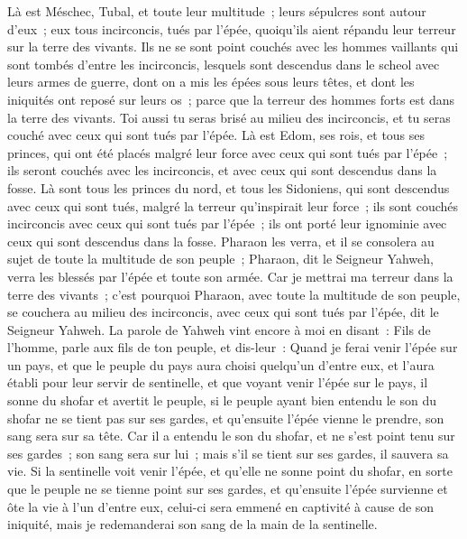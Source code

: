 \begin{multicols}{2}
Là est Méschec, Tubal, et toute leur multitude~; leurs sépulcres sont autour d'eux~; eux tous incirconcis, tués par l'épée, quoiqu'ils aient répandu leur terreur sur la terre des vivants.
Ils ne se sont point couchés avec les hommes vaillants qui sont tombés d'entre les incirconcis, lesquels sont descendus dans le scheol avec leurs armes de guerre, dont on a mis les épées sous leurs têtes, et dont les iniquités ont reposé sur leurs os~; parce que la terreur des hommes forts est dans la terre des vivants.
Toi aussi tu seras brisé au milieu des incirconcis, et tu seras couché avec ceux qui sont tués par l'épée.
Là est Edom, ses rois, et tous ses princes, qui ont été placés malgré leur force avec ceux qui sont tués par l'épée~; ils seront couchés avec les incirconcis, et avec ceux qui sont descendus dans la fosse.
Là sont tous les princes du nord, et tous les Sidoniens, qui sont descendus avec ceux qui sont tués, malgré la terreur qu'inspirait leur force~; ils sont couchés incirconcis avec ceux qui sont tués par l'épée~; ils ont porté leur ignominie avec ceux qui sont descendus dans la fosse.
Pharaon les verra, et il se consolera au sujet de toute la multitude de son peuple~; Pharaon, dit le Seigneur Yahweh, verra les blessés par l'épée et toute son armée.
Car je mettrai ma terreur dans la terre des vivants~; c'est pourquoi Pharaon, avec toute la multitude de son peuple, se couchera au milieu des incirconcis, avec ceux qui sont tués par l'épée, dit le Seigneur Yahweh.
\VerseOne{}La parole de Yahweh vint encore à moi en disant~:
Fils de l'homme, parle aux fils de ton peuple, et dis-leur~: Quand je ferai venir l'épée sur un pays, et que le peuple du pays aura choisi quelqu'un d'entre eux, et l'aura établi pour leur servir de sentinelle,
et que voyant venir l'épée sur le pays, il sonne du shofar et avertit le peuple,
si le peuple ayant bien entendu le son du shofar ne se tient pas sur ses gardes, et qu'ensuite l'épée vienne le prendre, son sang sera sur sa tête.
Car il a entendu le son du shofar, et ne s'est point tenu sur ses gardes~; son sang sera sur lui~; mais s'il se tient sur ses gardes, il sauvera sa vie.
Si la sentinelle voit venir l'épée, et qu'elle ne sonne point du shofar, en sorte que le peuple ne se tienne point sur ses gardes, et qu'ensuite l'épée survienne et ôte la vie à l'un d'entre eux, celui-ci sera emmené en captivité à cause de son iniquité, mais je redemanderai son sang de la main de la sentinelle.

\end{multicols}
